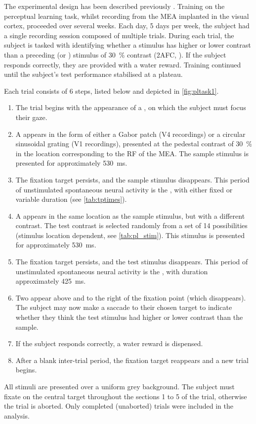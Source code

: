 The experimental design has been described previously \citep[see][]{Chen2013}.
Training on the perceptual learning task, whilst recording from the \ac{MEA} implanted in the visual cortex, proceeded over several weeks.
Each day, 5 days per week, the subject had a single recording session composed of multiple trials.
During each trial, the subject is tasked with identifying whether a  stimulus has higher or lower contrast than a preceding  (or ) stimulus of \SI{30}{\percent} contrast (\acl{2AFC}, ).
If the subject responds correctly, they are provided with a water reward.
Training continued until the subject's test performance stabilised at a plateau.

Each trial consists of 6 steps, listed below and depicted in \autoref{fig:pltask1}.
\begin{enumerate}
\item The trial begins with the appearance of a , on which the subject must focus their gaze.
\item A  appears in the form of either a Gabor patch (\ac{V4} recordings) or a circular sinusoidal grating (\ac{V1} recordings), presented at the pedestal contrast of \SI{30}{\percent} in the location corresponding to the \ac{RF} of the \ac{MEA}.
The sample stimulus is presented for approximately \SI{530}{\milli\second}.
\item The fixation target persists, and the sample stimulus disappears.
This period of unstimulated spontaneous neural activity is the , with either fixed or variable duration (see \autoref{tab:tptimes}).
\item A  appears in the same location as the sample stimulus, but with a different contrast.
The test contrast is selected randomly from a set of \num{14} possibilities (stimulus location dependent, see \autoref{tab:pl_stim}).
This stimulus is presented for approximately \SI{530}{\milli\second}.
\item The fixation target persists, and the test stimulus disappears.
This period of unstimulated spontaneous neural activity is the , with duration approximately \SI{425}{\milli\second}.
\item Two  appear above and to the right of the fixation point (which disappears).
The subject may now make a saccade to their chosen target to indicate whether they think the test stimulus had higher or lower contrast than the sample.
\item If the subject responds correctly, a water reward is dispensed.
\item After a blank inter-trial period, the fixation target reappears and a new trial begins.
\end{enumerate}
All stimuli are presented over a uniform grey background.
The subject must fixate on the central target throughout the sections 1 to 5 of the trial, otherwise the trial is aborted.
Only completed (unaborted) trials were included in the analysis.


